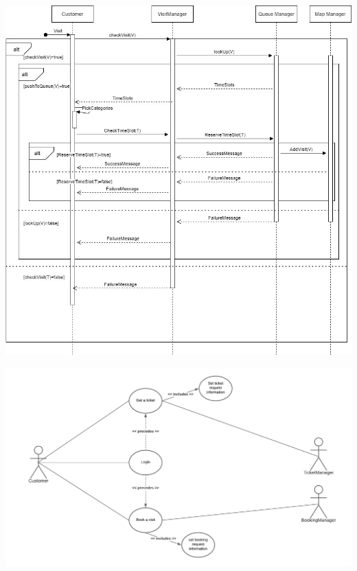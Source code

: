 \documentclass[a4paper, 12pt, oneside]{article}
\begin{document}
\begin{tabularx}{\linewidth}{| l | X |}
	\hline
	
\end{tabularx}

\begin{minipage}{\linewidth}
            \centering
           \includegraphics[height=0.5\textheight, scale=1, keepaspectratio]{img/seq_diag/GetVisitD.jpg}
\end{minipage}

\begin{minipage}{\linewidth}
        \centering
           \includegraphics[height=0.33\textheight, scale=0.1, keepaspectratio]{img/book_ticket_use_diagram.png}
        \end{minipage}
\end{document}
